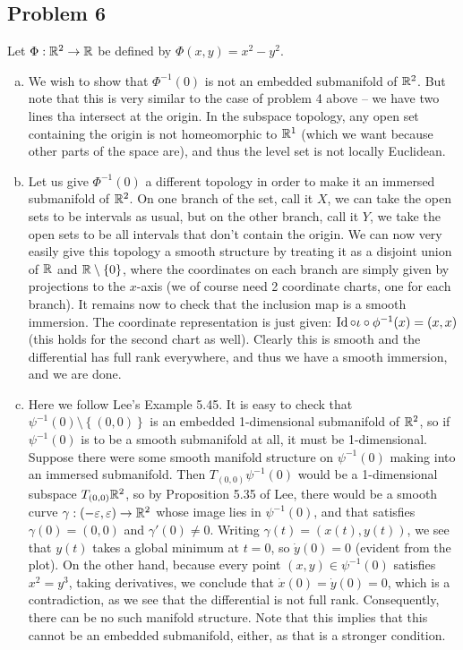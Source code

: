 \documentclass{../../mathnotes}
\begin{document}
\subsection*{Problem 6}
Let $\Phi:\mathbb{R}^2\to\mathbb{R}$ be defined by $\Phi(x,y)=x^2-y^2$.
\begin{enumerate}[(a)]
    \item We wish to show that $\Phi^{-1}(0)$ is not an embedded submanifold of $\mathbb{R}^2$. But note that this is
        very similar to the case of problem 4 above -- we have two lines tha intersect at the origin. In the subspace
        topology, any open set containing the origin is not homeomorphic to $\mathbb{R}^1$ (which we want because other parts of the
        space are), and thus the level set is not locally Euclidean.
    \item Let us give $\Phi^{-1}(0)$ a different topology in order to make it an immersed submanifold of $\mathbb{R}^2$. On
        one branch of the set, call it $X$, we can take the open sets to be intervals as usual, but on the other branch, call it $Y$,
        we take the open sets to be all intervals that don't contain the origin. We can now very easily give this topology
        a smooth structure by treating it as a disjoint union of $\mathbb{R}$ and $\mathbb{R}\setminus \left\{ 0 \right\}$, where the coordinates
        on each branch are simply given by projections to the $x$-axis (we of course need 2 coordinate charts, one for each branch).
        It remains now to check that the inclusion map is
        a smooth immersion. The coordinate representation is just given: $\operatorname{Id}\circ\iota\circ\phi^{-1}(x)=(x,x)$ (this holds for the second
        chart as well). Clearly this is smooth
        and the differential has full rank everywhere, and thus we have a smooth immersion, and we are done.
    \item Here we follow Lee's Example 5.45.
        It is easy to check that $\psi^{-1}(0)\setminus\left\{ (0,0) \right\}$ is an embedded 1-dimensional submanifold of $\mathbb{R}^2$,
        so if $\psi^{-1}(0)$ is to be a smooth submanifold at all, it must be 1-dimensional. Suppose there were some smooth manifold
        structure on $\psi^{-1}(0)$ making into an immersed submanifold. Then $T_{(0,0)}\psi^{-1}(0)$ would be a 1-dimensional
        subspace $T_{(0,0)}\mathbb{R}^2$, so by Proposition 5.35 of Lee, there would be a smooth curve $\gamma:(-\varepsilon,\varepsilon)\to\mathbb{R}^2$
        whose image lies in $\psi^{-1}(0)$, and that satisfies $\gamma(0)=(0,0)$ and $\gamma'(0)\neq0$. Writing $\gamma(t)=(x(t),y(t))$,
        we see that $y(t)$ takes a global minimum at $t=0$, so $\dot y(0)=0$ (evident from the plot). On the other hand, because every
        point $(x,y)\in\psi^{-1}(0)$ satisfies $x^2=y^3$, taking derivatives, we conclude that $\dot x(0)=\dot y(0)=0$, which is a contradiction, as
        we see that the differential is not full rank. Consequently, there can be no such manifold structure.
        Note that this implies that this cannot be an embedded submanifold, either, as that is a stronger condition.
\end{enumerate}
\end{document}
